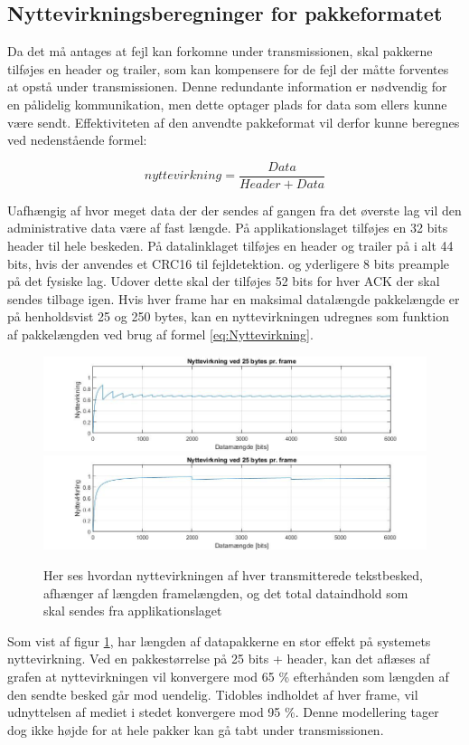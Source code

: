 \subsection{Nyttevirkningsberegninger for pakkeformatet}
Da det må antages at fejl kan forkomne under transmissionen, skal pakkerne tilføjes en header og trailer, som kan kompensere for de fejl der måtte forventes at opstå under transmissionen. Denne redundante information er nødvendig for en pålidelig kommunikation, men dette optager plads for data som ellers kunne være sendt. Effektiviteten af den anvendte pakkeformat vil derfor kunne beregnes ved nedenstående formel: 

\begin{equation}
nyttevirkning = \frac{Data}{Header + Data}
\label{eq:Nyttevirkning}
\end{equation}

Uafhængig af hvor meget data der der sendes af gangen fra det øverste lag vil den administrative data være af fast længde. På applikationslaget tilføjes en 32 bits header til hele beskeden. På datalinklaget tilføjes en header og trailer på i alt 44 bits, hvis der anvendes et CRC16 til fejldetektion. og yderligere 8 bits preample på det fysiske lag. Udover dette skal der tilføjes 52 bits for hver ACK der skal sendes tilbage igen. Hvis hver frame har en maksimal datalængde pakkelængde er på henholdsvist 25 og 250 bytes, kan en nyttevirkningen udregnes som funktion af pakkelængden ved brug af formel \eqref{eq:Nyttevirkning}.  

\begin{figure}[h]
\centering
\includegraphics[scale=0.5]{Billeder/Nyttevirkning25.jpg} 
\includegraphics[scale=0.5]{Billeder/Nyttevirkning250.jpg}
\caption{ Her ses hvordan nyttevirkningen af hver transmitterede tekstbesked, afhænger af længden framelængden, og det total dataindhold som skal sendes fra applikationslaget}
\label{fig:Nyttevirkningved25}
\end{figure}

Som vist af figur \ref{fig:Nyttevirkningved25}, har længden af datapakkerne en stor effekt på systemets nyttevirkning. Ved en pakkestørrelse på 25 bits + header, kan det aflæses af grafen at nyttevirkningen vil konvergere mod 65 \% efterhånden som længden af den sendte besked går mod uendelig. Tidobles indholdet af hver frame, vil udnyttelsen af mediet i stedet konvergere mod 95 \%. Denne modellering tager dog ikke højde for at hele pakker kan gå tabt under transmissionen. 